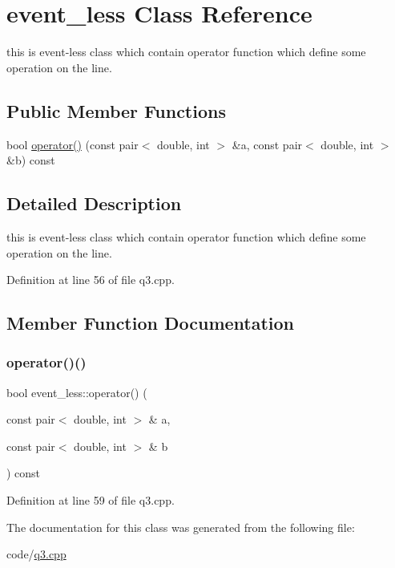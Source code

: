\hypertarget{classevent__less}{}\section{event\+\_\+less Class Reference}
\label{classevent__less}


this is event-\/less class which contain operator function which define some operation on the line.  


\subsection*{Public Member Functions}
\begin{DoxyCompactItemize}
\item 
bool \hyperlink{classevent__less_aee69afb3953f36c9c2309250ef051b2e}{operator()} (const pair$<$ double, int $>$ \&a, const pair$<$ double, int $>$ \&b) const
\end{DoxyCompactItemize}


\subsection{Detailed Description}
this is event-\/less class which contain operator function which define some operation on the line. 

Definition at line 56 of file q3.\+cpp.



\subsection{Member Function Documentation}
\mbox{\label{classevent__less_aee69afb3953f36c9c2309250ef051b2e}} 
\subsubsection{\texorpdfstring{operator()()}{operator()()}}
{\footnotesize\ttfamily bool event\+\_\+less\+::operator() (\begin{DoxyParamCaption}\item[{const pair$<$ double, int $>$ \&}]{a,  }\item[{const pair$<$ double, int $>$ \&}]{b }\end{DoxyParamCaption}) const\hspace{0.3cm}{\ttfamily [inline]}}



Definition at line 59 of file q3.\+cpp.



The documentation for this class was generated from the following file\+:\begin{DoxyCompactItemize}
\item 
code/\hyperlink{q3_8cpp}{q3.\+cpp}\end{DoxyCompactItemize}
